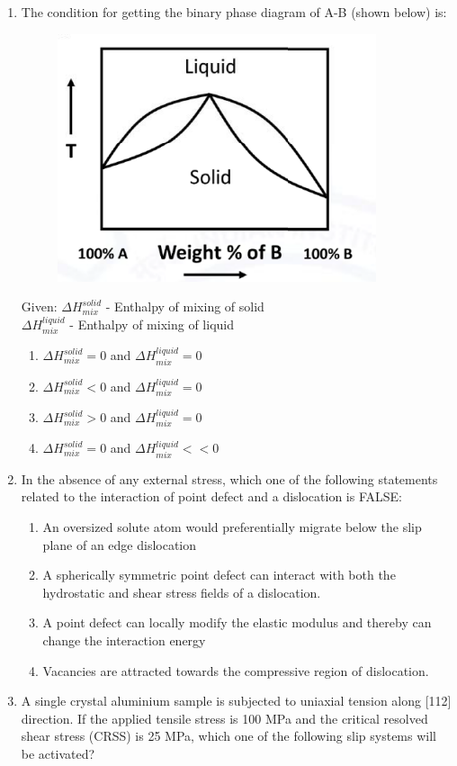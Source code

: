 \documentclass[journal]{IEEEtran}
\theoremstyle{remark}
\begin{document}
\begin{enumerate}[resume]
\item The condition for getting the binary phase diagram of A-B (shown below) is: \hfill{}
\begin{figure}[H]
    \centering
    \includegraphics[width=0.3\columnwidth]{figs/Q.30.png}
    \caption{}
    \label{fig:placeholder}
\end{figure}
Given: $\Delta H_{mix}^{solid}$ - Enthalpy of mixing of solid \\ $\Delta H_{mix}^{liquid}$ - Enthalpy of mixing of liquid
\begin{multicols}{2}
\begin{enumerate}
\item $\Delta H_{mix}^{solid} = 0$ and $\Delta H_{mix}^{liquid} = 0$
\item $\Delta H_{mix}^{solid} < 0$ and $\Delta H_{mix}^{liquid} = 0$
\item $\Delta H_{mix}^{solid} > 0$ and $\Delta H_{mix}^{liquid} = 0$
\item $\Delta H_{mix}^{solid} = 0$ and $\Delta H_{mix}^{liquid} << 0$
\end{enumerate}
\end{multicols}

\item In the absence of any external stress, which one of the following statements related to the interaction of point defect and a dislocation is FALSE: \hfill{}
\begin{enumerate}
\item An oversized solute atom would preferentially migrate below the slip plane of an edge dislocation
\item A spherically symmetric point defect can interact with both the hydrostatic and shear stress fields of a dislocation.
\item A point defect can locally modify the elastic modulus and thereby can change the interaction energy
\item Vacancies are attracted towards the compressive region of dislocation.
\end{enumerate}

\item A single crystal aluminium sample is subjected to uniaxial tension along
[112] direction. If the applied tensile stress is 100 MPa and the critical
resolved shear stress (CRSS) is 25 MPa, which one of the following slip
systems will be activated?


\end{enumerate}
\end{document}
